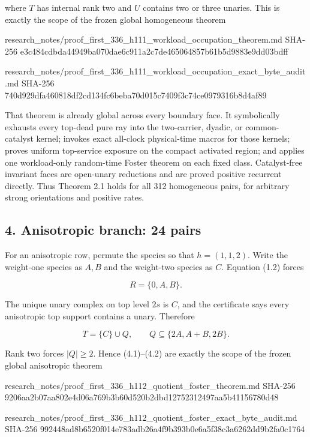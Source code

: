 where \(T\) has internal rank two and \(U\) contains two or three
unaries. This is exactly the scope of the frozen global homogeneous
theorem

\begin{CodeBlock}
research_notes/proof_first_336_h111_workload_occupation_theorem.md
SHA-256 e3c484cdbda44949ba070dae6c911a2c7de465064857b61b5d9883e9dd03bdff

research_notes/proof_first_336_h111_workload_occupation_exact_byte_audit.md
SHA-256 740d929dfa460818df2cd134fc6beba70d015c7409f3c74ce0979316b8d4af89
\end{CodeBlock}

That theorem is already global across every boundary face. It
symbolically exhausts every top-dead pure ray into the two-carrier,
dyadic, or common-catalyst kernel; invokes exact all-clock physical-time
macros for those kernels; proves uniform top-service exposure on the
compact activated region; and applies one workload-only random-time
Foster theorem on each fixed class. Catalyst-free invariant faces are
open-unary reductions and are proved positive recurrent directly. Thus
Theorem 2.1 holds for all 312 homogeneous pairs, for arbitrary strong
orientations and positive rates.

\subsection{4. Anisotropic branch: 24
pairs}

For an anisotropic row, permute the species so that \(h=(1,1,2)\). Write
the weight-one species as \(A,B\) and the weight-two species as \(C\).
Equation (1.2) forces

\[
 R=\{0,A,B\}.                                         \tag{4.1}
\]

The unique unary complex on top level \(2s\) is \(C\), and the
certificate says every anisotropic top support contains a unary.
Therefore

\[
 T=\{C\}\cup Q,\qquad
 Q\subseteq\{2A,A+B,2B\}.                             \tag{4.2}
\]

Rank two forces \(|Q|\ge2\). Hence (4.1)--(4.2) are exactly the scope of
the frozen global anisotropic theorem

\begin{CodeBlock}
research_notes/proof_first_336_h112_quotient_foster_theorem.md
SHA-256 9206aa2b07aa802e4d06a769b3b60d520b2dbd12752312497aa5b41156780d48

research_notes/proof_first_336_h112_quotient_foster_exact_byte_audit.md
SHA-256 992448ad8b6520f014e783adb26a4f9b393b0e6a5f38c3a6262dd9b2fa0c1764
\end{CodeBlock}


